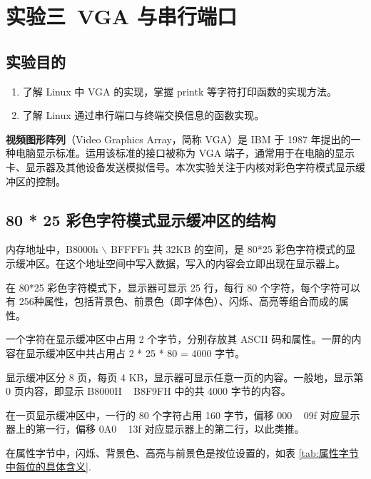 \section{实验三\ VGA 与串行端口}

\subsection{实验目的}

\begin{enumerate}
    \item 了解 Linux 中 VGA 的实现，掌握 printk 等字符打印函数的实现方法。
    \item 了解 Linux 通过串行端口与终端交换信息的函数实现。
\end{enumerate}

\textbf{视频图形阵列}（Video Graphics Array，简称 VGA）是 IBM 于 1987 年提出的一种电脑显示标准。运用该标准的接口被称为 VGA 端子，通常用于在电脑的显示卡、显示器及其他设备发送模拟信号。本次实验关注于内核对彩色字符模式显示缓冲区的控制。

\subsection{80 * 25 彩色字符模式显示缓冲区的结构}

内存地址中，B8000h $\backslash$ BFFFFh 共 32KB 的空间，是 80*25 彩色字符模式的显示缓冲区。在这个地址空间中写入数据，写入的内容会立即出现在显示器上。

在 80*25 彩色字符模式下，显示器可显示 25 行，每行 80 个字符，每个字符可以有 256种属性，包括背景色、前景色（即字体色）、闪烁、高亮等组合而成的属性。

一个字符在显示缓冲区中占用 2 个字节，分别存放其 ASCII 码和属性。一屏的内容在显示缓冲区中共占用占 2 * 25 * 80 = 4000 字节。

显示缓冲区分 8 页，每页 4 KB，显示器可显示任意一页的内容。一般地，显示第 0 页内容，即显示 B8000H ~ B8F9FH 中的共 4000 字节的内容。

在一页显示缓冲区中，一行的 80 个字符占用 160 字节，偏移 000 ~ 09f 对应显示器上的第一行，偏移 0A0 ~ 13f 对应显示器上的第二行，以此类推。

在属性字节中，闪烁、背景色、高亮与前景色是按位设置的，如表 \ref{tab:属性字节中每位的具体含义}.


